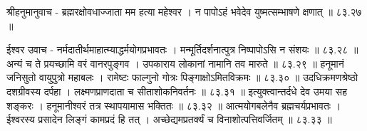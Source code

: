 श्रीहनुमानुवाच -
ब्रह्मरक्षोवधाज्जाता मम हत्या महेश्वर ।
न पापोऽहं भवेदेव युष्मत्सम्भाषणे क्षणात् ॥ ८३.२७ ॥

ईश्वर उवाच -
नर्मदातीर्थमाहात्म्याद्धर्मयोगप्रभावतः ।
मन्मूर्तिदर्शनात्पुत्र निष्पापोऽसि न संशयः ॥ ८३.२८ ॥
अन्यं च ते प्रयच्छामि वरं वानरपुङ्गव ।
उपकाराय लोकानां नामानि तव मारुते ॥ ८३.२९ ॥
हनूमानं जनिसुतो वायुपुत्रो महाबलः ।
रामेष्टः फाल्गुनो गोत्रः पिङ्गाक्षोऽमितविक्रमः ॥ ८३.३० ॥
उदधिक्रमणश्रेष्ठो दशग्रीवस्य दर्पहा ।
लक्ष्मणप्राणदाता च सीताशोकनिवर्तनः ॥ ८३.३१ ॥
इत्युक्त्वान्तर्दधे देव उमया सह शङ्करः ।
हनूमानीश्वरं तत्र स्थापयामास भक्तितः ॥ ८३.३२ ॥
आत्मयोगबलेनैव ब्रह्मचर्यप्रभावतः ।
ईश्वरस्य प्रसादेन लिङ्गं कामप्रदं हि तत् ।
अच्छेद्यमप्रतर्क्यं च विनाशोत्पत्तिवर्जितम् ॥ ८३.३३ ॥






